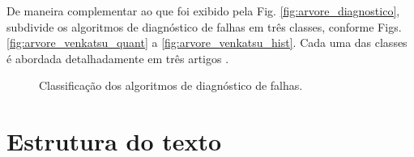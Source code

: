De maneira complementar ao que foi exibido pela Fig.
\ref{fig:arvore_diagnostico},  subdivide os
algoritmos de diagnóstico de falhas em três classes, conforme Figs.
\ref{fig:arvore_venkatsu_quant} a \ref{fig:arvore_venkatsu_hist}. Cada uma das
classes é abordada detalhadamente em três artigos
\cite{venkatasu:2003a,venkatasu:2003b,venkatasu:2003c}.

\begin{figure}[htb]
\centering
    \caption{Classificação dos algoritmos de diagnóstico de falhas.}
    \label{fig:arvore_venkatsu}
\end{figure}

\section{Estrutura do texto}

